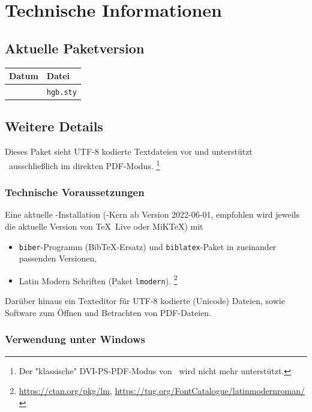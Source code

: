 \chapter{Technische Informationen}
\label{app:TechnischeInfos}

\section{Aktuelle Paketversion}

\begin{center}
	\begin{tabular}{@{}ll@{}}
		\toprule
		Datum    & Datei            \\
		\midrule
		\hgbDate & \texttt{hgb.sty} \\
		\bottomrule
	\end{tabular}
\end{center}


\section{Weitere Details}


Dieses Paket sieht \mbox{UTF-8} kodierte Textdateien vor und
unterstützt \latex\ ausschließlich im direkten PDF-Modus.%
\footnote{Der "klassische" DVI-PS-PDF-Modus von \latex\ wird nicht mehr
unterstützt.}

\subsection{Technische Voraussetzungen}

Eine aktuelle \latex-Installation (\latex-Kern ab Version 2022-06-01,
empfohlen wird jeweils die aktuelle Version von TeX~Live oder MiKTeX) mit
%
\begin{itemize}
		\item \texttt{biber}-Programm (BibTeX-Ersatz) und \texttt{biblatex}-Paket
			in zueinander passenden Versionen,
		\item Latin Modern Schriften (Paket \texttt{lmodern}).%
			\footnote{\url{https://ctan.org/pkg/lm},
				\url{https://tug.org/FontCatalogue/latinmodernroman/}}
\end{itemize}
%
Darüber hinaus ein Texteditor für UTF-8 kodierte (Unicode) Dateien,
sowie Software zum Öffnen und Betrachten von PDF-Dateien.


\subsection{Verwendung unter Windows}
\label{sec:VerwendungUnterWindows}

